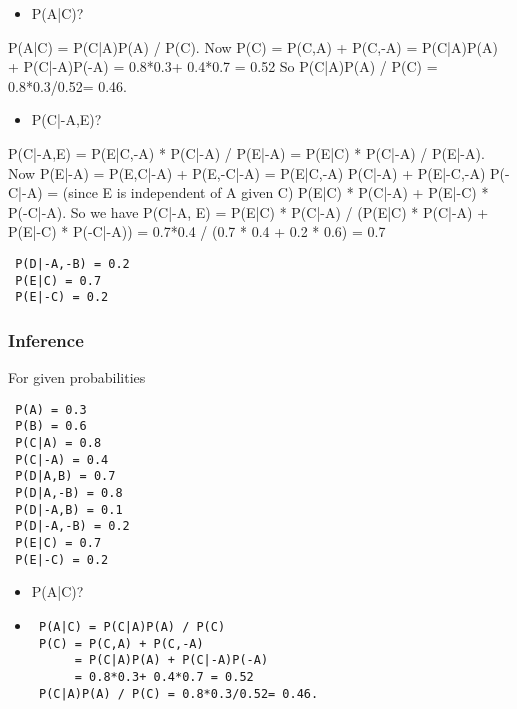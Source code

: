 \documentclass[compress, 9pt]{beamer}
\begin{document}
\begin{itemize}
\item P(A|C)?
\end{itemize}


P(A|C) = P(C|A)P(A) / P(C). 
Now P(C) = P(C,A) + P(C,-A) = 
P(C|A)P(A) + P(C|-A)P(-A) = 
0.8*0.3+ 0.4*0.7 = 0.52
So P(C|A)P(A) / P(C) = 0.8*0.3/0.52= 0.46.



\begin{itemize}
\item P(C|-A,E)?
\end{itemize}

P(C|-A,E) = 
P(E|C,-A) * P(C|-A) / P(E|-A) = 
P(E|C) * P(C|-A) / P(E|-A). 
Now P(E|-A) = P(E,C|-A) + P(E,-C|-A) =
P(E|C,-A) P(C|-A) + P(E|-C,-A) P(-C|-A) = (since E is independent of A given C)
P(E|C) * P(C|-A) + P(E|-C) * P(-C|-A).
So we have 
P(C|-A, E) = 
P(E|C) * P(C|-A) / (P(E|C) * P(C|-A) + P(E|-C) * P(-C|-A)) =
0.7*0.4 / (0.7 * 0.4 + 0.2 * 0.6) = 0.7
\begin{verbatim}
 P(D|-A,-B) = 0.2
 P(E|C) = 0.7
 P(E|-C) = 0.2
\end{verbatim}
\begin{frame}[fragile]
\frametitle{Inference}
\label{sec-4-1}

For given probabilities
\begin{verbatim}
 P(A) = 0.3
 P(B) = 0.6
 P(C|A) = 0.8
 P(C|-A) = 0.4
 P(D|A,B) = 0.7
 P(D|A,-B) = 0.8
 P(D|-A,B) = 0.1
 P(D|-A,-B) = 0.2
 P(E|C) = 0.7
 P(E|-C) = 0.2
\end{verbatim}
\begin{itemize}

\item P(A|C)?
\label{sec-4-1-1}%

\item <2->
\label{sec-4-1-2}%
\begin{verbatim}
 P(A|C) = P(C|A)P(A) / P(C)
 P(C) = P(C,A) + P(C,-A) 
      = P(C|A)P(A) + P(C|-A)P(-A) 
      = 0.8*0.3+ 0.4*0.7 = 0.52
 P(C|A)P(A) / P(C) = 0.8*0.3/0.52= 0.46.
\end{verbatim}

\end{itemize} %
\end{frame}
\end{document}
